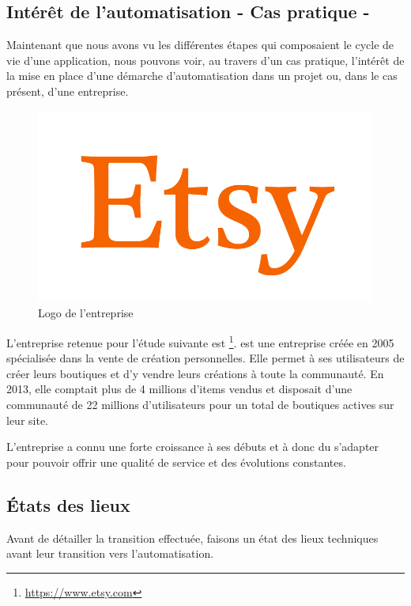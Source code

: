 \subsection{Intérêt de l'automatisation - Cas pratique - \etsy}

Maintenant que nous avons vu les différentes étapes qui composaient le cycle de vie d'une application, nous pouvons voir, au travers d'un cas pratique, l'intérêt de la mise en place d'une démarche d'automatisation dans un projet ou, dans le cas présent, d'une entreprise.

\begin{figure}
	\includegraphics[scale=0.125]{img/etsy.png}
	\caption{Logo de l'entreprise \etsy}\label{fig:etsy}
\end{figure}

L'entreprise retenue pour l'étude suivante est \etsy\footnote{\url{https://www.etsy.com}}. \etsy{} est une entreprise créée en 2005 spécialisée dans la vente de création personnelles. Elle permet à ses utilisateurs de créer leurs boutiques et d'y vendre leurs créations à toute la communauté. En 2013, elle comptait plus de 4 millions d'items vendus et disposait d'une communauté de 22 millions d'utilisateurs pour un total de  boutiques actives sur leur site.

L'entreprise a connu une forte croissance à ses débuts et à donc du s'adapter pour pouvoir offrir une qualité de service et des évolutions constantes.

\subsection{États des lieux}

Avant de détailler la transition effectuée, faisons un état des lieux techniques avant leur transition vers l'automatisation.

